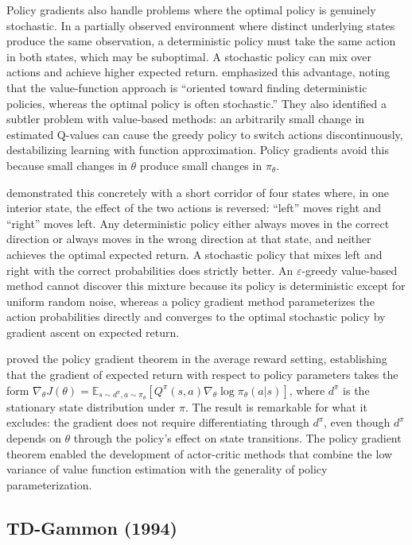 Policy gradients also handle problems where the optimal policy is genuinely stochastic. In a partially observed environment where distinct underlying states produce the same observation, a deterministic policy must take the same action in both states, which may be suboptimal. A stochastic policy can mix over actions and achieve higher expected return. \citet{SuttonMcAllester2000} emphasized this advantage, noting that the value-function approach is ``oriented toward finding deterministic policies, whereas the optimal policy is often stochastic.'' They also identified a subtler problem with value-based methods: an arbitrarily small change in estimated Q-values can cause the greedy policy to switch actions discontinuously, destabilizing learning with function approximation. Policy gradients avoid this because small changes in $\theta$ produce small changes in $\pi_\theta$.

\citet{SuttonMcAllester2000} demonstrated this concretely with a short corridor of four states where, in one interior state, the effect of the two actions is reversed: ``left'' moves right and ``right'' moves left. Any deterministic policy either always moves in the correct direction or always moves in the wrong direction at that state, and neither achieves the optimal expected return. A stochastic policy that mixes left and right with the correct probabilities does strictly better. An $\varepsilon$-greedy value-based method cannot discover this mixture because its policy is deterministic except for uniform random noise, whereas a policy gradient method parameterizes the action probabilities directly and converges to the optimal stochastic policy by gradient ascent on expected return.

\citet{SuttonMcAllester2000} proved the policy gradient theorem in the average reward setting, establishing that the gradient of expected return with respect to policy parameters takes the form $\nabla_\theta J(\theta) = \mathbb{E}_{s \sim d^\pi, a \sim \pi_\theta} [Q^\pi(s,a) \nabla_\theta \log \pi_\theta(a|s)]$, where $d^\pi$ is the stationary state distribution under $\pi$. The result is remarkable for what it excludes: the gradient does not require differentiating through $d^\pi$, even though $d^\pi$ depends on $\theta$ through the policy's effect on state transitions. The policy gradient theorem enabled the development of actor-critic methods that combine the low variance of value function estimation with the generality of policy parameterization.

\subsection{TD-Gammon (1994)}

